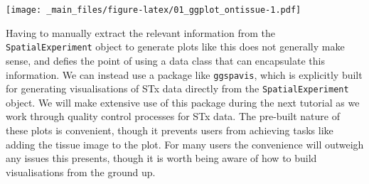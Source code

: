 \documentclass[
]{book}
\newenvironment{Shaded}{\begin{snugshade}}{\end{snugshade}}
\newcommand{\AttributeTok}[1]{\textcolor[rgb]{0.13,0.29,0.53}{#1}}
\newcommand{\DecValTok}[1]{\textcolor[rgb]{0.00,0.00,0.81}{#1}}
\newcommand{\DocumentationTok}[1]{\textcolor[rgb]{0.56,0.35,0.01}{\textbf{\textit{#1}}}}
\newcommand{\FloatTok}[1]{\textcolor[rgb]{0.00,0.00,0.81}{#1}}
\newcommand{\FunctionTok}[1]{\textcolor[rgb]{0.13,0.29,0.53}{\textbf{#1}}}
\newcommand{\NormalTok}[1]{#1}
\newcommand{\OtherTok}[1]{\textcolor[rgb]{0.56,0.35,0.01}{#1}}
\newcommand{\SpecialCharTok}[1]{\textcolor[rgb]{0.81,0.36,0.00}{\textbf{#1}}}
\begin{document}
\begin{Shaded}
\end{Shaded}

\texttt{[image: \_main\_files/figure-latex/01\_ggplot\_ontissue-1.pdf]}

Having to manually extract the relevant information from the \texttt{SpatialExperiment} object to generate plots like this does not generally make sense, and defies the point of using a data class that can encapsulate this information. We can instead use a package like \texttt{ggspavis}, which is explicitly built for generating visualisations of STx data directly from the \texttt{SpatialExperiment} object. We will make extensive use of this package during the next tutorial as we work through quality control processes for STx data. The pre-built nature of these plots is convenient, though it prevents users from achieving tasks like adding the tissue image to the plot. For many users the convenience will outweigh any issues this presents, though it is worth being aware of how to build visualisations from the ground up.
\end{document}
